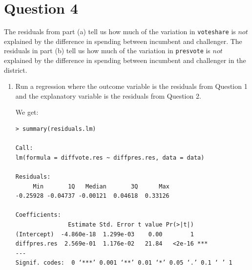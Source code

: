 \documentclass[12pt,letterpaper]{article}
\begin{document}
\newpage	
\section*{Question 4}
\noindent The residuals from part (a) tell us how much of the variation in \texttt{voteshare} is $not$ explained by the difference in spending between incumbent and challenger. The residuals in part (b) tell us how much of the variation in \texttt{presvote} is $not$ explained by the difference in spending between incumbent and challenger in the district.\\
	\begin{enumerate}
		\item Run a regression where the outcome variable is the residuals from Question 1 and the explanatory variable is the residuals from Question 2.\\
\vspace{.5cm}
  
\vspace{.5cm}  
\noindent We get:\\
\begin{verbatim}
> summary(residuals.lm)

Call:
lm(formula = diffvote.res ~ diffpres.res, data = data)

Residuals:
     Min       1Q   Median       3Q      Max 
-0.25928 -0.04737 -0.00121  0.04618  0.33126 

Coefficients:
               Estimate Std. Error t value Pr(>|t|)    
(Intercept)  -4.860e-18  1.299e-03    0.00        1    
diffpres.res  2.569e-01  1.176e-02   21.84   <2e-16 ***
---
Signif. codes:  0 ‘***’ 0.001 ‘**’ 0.01 ‘*’ 0.05 ‘.’ 0.1 ‘ ’ 1


\end{verbatim}
\end{enumerate}
\end{document}
